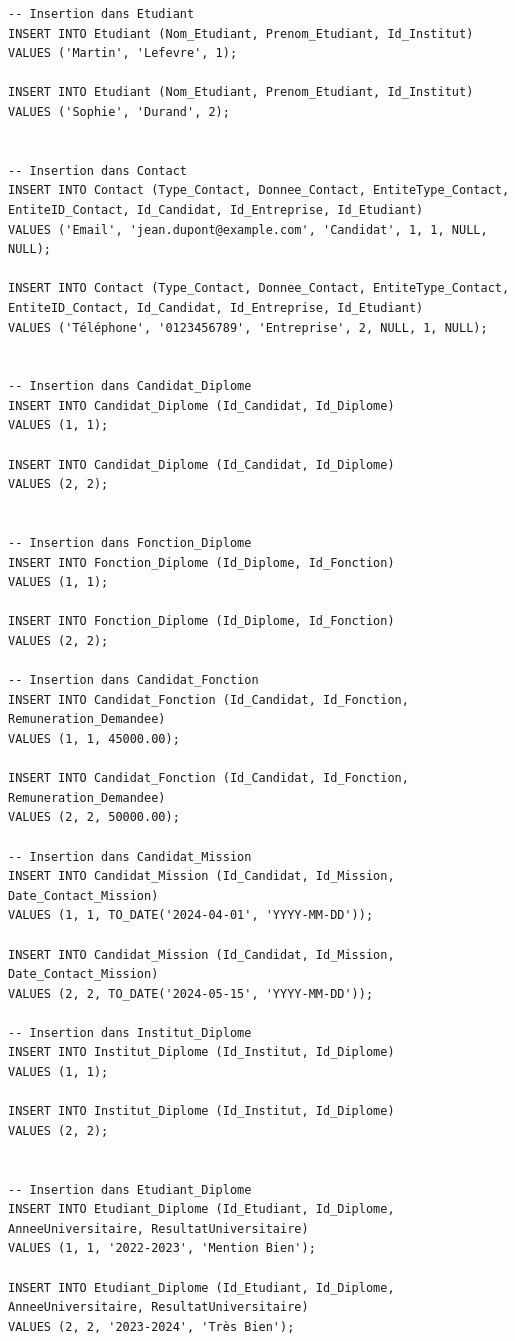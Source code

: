 \documentclass[a4paper,12pt]{article}
\begin{document}
\begin{verbatim}
-- Insertion dans Etudiant
INSERT INTO Etudiant (Nom_Etudiant, Prenom_Etudiant, Id_Institut)
VALUES ('Martin', 'Lefevre', 1);

INSERT INTO Etudiant (Nom_Etudiant, Prenom_Etudiant, Id_Institut)
VALUES ('Sophie', 'Durand', 2);


-- Insertion dans Contact
INSERT INTO Contact (Type_Contact, Donnee_Contact, EntiteType_Contact, EntiteID_Contact, Id_Candidat, Id_Entreprise, Id_Etudiant)
VALUES ('Email', 'jean.dupont@example.com', 'Candidat', 1, 1, NULL, NULL);

INSERT INTO Contact (Type_Contact, Donnee_Contact, EntiteType_Contact, EntiteID_Contact, Id_Candidat, Id_Entreprise, Id_Etudiant)
VALUES ('Téléphone', '0123456789', 'Entreprise', 2, NULL, 1, NULL);


-- Insertion dans Candidat_Diplome
INSERT INTO Candidat_Diplome (Id_Candidat, Id_Diplome)
VALUES (1, 1);

INSERT INTO Candidat_Diplome (Id_Candidat, Id_Diplome)
VALUES (2, 2);


-- Insertion dans Fonction_Diplome
INSERT INTO Fonction_Diplome (Id_Diplome, Id_Fonction)
VALUES (1, 1);

INSERT INTO Fonction_Diplome (Id_Diplome, Id_Fonction)
VALUES (2, 2);

-- Insertion dans Candidat_Fonction
INSERT INTO Candidat_Fonction (Id_Candidat, Id_Fonction, Remuneration_Demandee)
VALUES (1, 1, 45000.00);

INSERT INTO Candidat_Fonction (Id_Candidat, Id_Fonction, Remuneration_Demandee)
VALUES (2, 2, 50000.00);

-- Insertion dans Candidat_Mission
INSERT INTO Candidat_Mission (Id_Candidat, Id_Mission, Date_Contact_Mission)
VALUES (1, 1, TO_DATE('2024-04-01', 'YYYY-MM-DD'));

INSERT INTO Candidat_Mission (Id_Candidat, Id_Mission, Date_Contact_Mission)
VALUES (2, 2, TO_DATE('2024-05-15', 'YYYY-MM-DD'));

-- Insertion dans Institut_Diplome
INSERT INTO Institut_Diplome (Id_Institut, Id_Diplome)
VALUES (1, 1);

INSERT INTO Institut_Diplome (Id_Institut, Id_Diplome)
VALUES (2, 2);


-- Insertion dans Etudiant_Diplome
INSERT INTO Etudiant_Diplome (Id_Etudiant, Id_Diplome, AnneeUniversitaire, ResultatUniversitaire)
VALUES (1, 1, '2022-2023', 'Mention Bien');

INSERT INTO Etudiant_Diplome (Id_Etudiant, Id_Diplome, AnneeUniversitaire, ResultatUniversitaire)
VALUES (2, 2, '2023-2024', 'Très Bien');


\end{verbatim}
\end{document}
